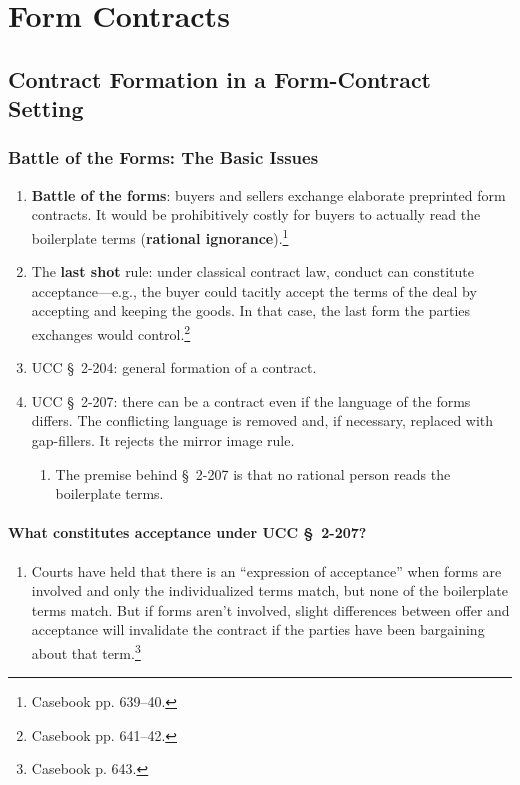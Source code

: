 \section{Form Contracts}

\subsection{Contract Formation in a Form-Contract Setting}

\subsubsection{Battle of the Forms: The Basic Issues}

\begin{enumerate}
    \item \textbf{Battle of the forms}: buyers and sellers exchange elaborate 
    preprinted form contracts. It would be prohibitively costly for buyers to 
    actually read the boilerplate terms (\textbf{rational 
    ignorance}).\footnote{Casebook pp. 639--40.}
    \item  The \textbf{last shot} rule: under classical contract law, conduct 
    can constitute acceptance---e.g., the buyer could tacitly accept the 
    terms of the deal by accepting and keeping the goods. In that case, the 
    last form the parties exchanges would control.\footnote{Casebook pp. 
    641--42.}
    \item UCC \S\ 2-204: general formation of a contract.
    \item UCC \S\ 2-207: there can be a contract even if the language of the 
    forms differs. The conflicting language is removed and, if necessary, 
    replaced with gap-fillers. It rejects the mirror image rule.
    \begin{enumerate}
        \item The premise behind \S\ 2-207 is that no rational person reads 
        the boilerplate terms.
    \end{enumerate}
\end{enumerate}

\paragraph{What constitutes acceptance under UCC \S\ 2-207?}

\begin{enumerate}
    \item Courts have held that there is an ``expression of acceptance'' when 
    forms are involved and only the individualized terms match, but none of 
    the boilerplate terms match. But if forms aren't involved, slight 
    differences between offer and acceptance will invalidate the contract if 
    the parties have been bargaining about that term.\footnote{Casebook p. 
    643.}
\end{enumerate}


